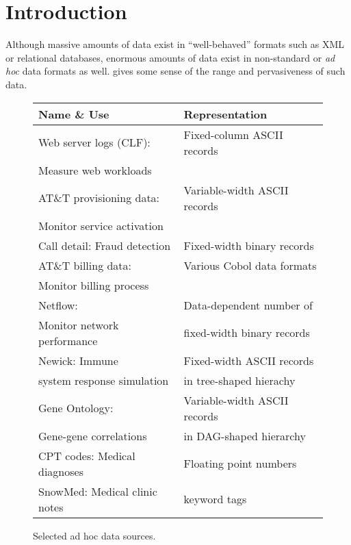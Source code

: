 \section{Introduction}
\label{section:intro}
Although massive amounts of data exist in ``well-behaved'' formats such
as XML or relational databases, enormous amounts of data exist in
non-standard or \textit{ad hoc} data formats as well. 
gives some sense of the range and pervasiveness of such data.
\begin{figure}
\begin{center}
\begin{tabular}{|l|l|}
\hline
Name \& Use   &  Representation               \\ \hline\hline
Web server logs (CLF):  &  Fixed-column ASCII records \\ 
Measure web workloads &                             \\ \hline
AT\&T provisioning data: & Variable-width ASCII records  \\ 
Monitor service activation &                              \\ \hline
Call detail: Fraud detection  &  Fixed-width binary records \\  \hline 
AT\&T billing data: & Various Cobol data formats  \\ 
Monitor billing process   &                             \\ \hline
Netflow:                        & Data-dependent number of     \\ 
Monitor network performance  & fixed-width binary records  \\ \hline
Newick:   Immune                 & Fixed-width ASCII records \\ 
system response simulation & in tree-shaped hierachy\\ \hline                                
Gene Ontology:             & Variable-width ASCII records \\
Gene-gene correlations     & in DAG-shaped hierarchy \\ \hline
CPT codes: Medical diagnoses & Floating point numbers \\ \hline
SnowMed: Medical clinic notes & keyword tags  \\ \hline
\end{tabular}

\caption{Selected ad hoc data sources.}
\label{figure:data-sources}
\end{center}
\end{figure}
